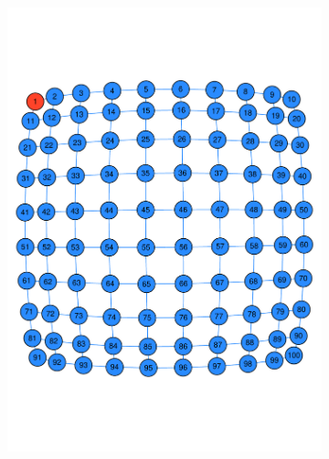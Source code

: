\documentclass[11pt]{article}
\begin{document}
\begin{figure}[t]
	\centering
	\begin{subfigure}[b]{0.49\textwidth}
    	\includegraphics[width=\textwidth]{grid_start.pdf}
        \label{fig:start_grid}
	\end{subfigure}
 	\begin{subfigure}[b]{0.49\textwidth}

\end{subfigure}
\end{figure}
\end{document}
